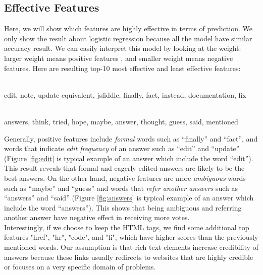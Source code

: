 \documentclass[11pt]{article}
\begin{document}
\subsection{Effective Features}
Here, we will show which features are highly effective in terms of prediction. We only show the result about logistic regression because all the model have similar accuracy result. We can easily interpret this model by looking at the weight: larger weight means positive features , and smaller weight means negative features. Here are resulting top-10 most effective and least effective features:
\begin{description}
\setlength\itemsep{0em}
\item[\bf{Positive}] \hfill\\
edit, note, update equivalent, jsfiddle, finally, fact, instead, documentation, fix
\item[\bf{Negative}] \hfill\\
answers, think, tried, hope, maybe, answer, thought, guess, said, mentioned
\end{description}
Generally, positive features include {\it formal} words such as ``finally'' and ``fact'', and words that indicate {\it edit frequency} of an answer such as ``edit'' and ``update'' (Figure \ref{fig:edit} is typical example of an answer which include the word ``edit''). This result reveals that formal and eagerly edited answers are likely to be the best answers. On the other hand, negative features are more {\it ambiguous} words such as ``maybe'' and ``guess'' and words that {\it refer another answers} such as ``answers'' and ``said'' (Figure \ref{fig:answers} is typical example of an answer which include the word ``answers''). This shows that being ambiguous and referring another answer have negative effect in receiving more votes. \\
Interestingly, if we choose to keep the HTML tags, we find some additional top features  "href", "hr", "code", and "li", which have higher scores than the previously mentioned words. Our assumption is that  rich text elements increase credibility of answers because these links usually redirects to websites that are highly credible or focuses on a very specific domain of problems. 
\end{document}
